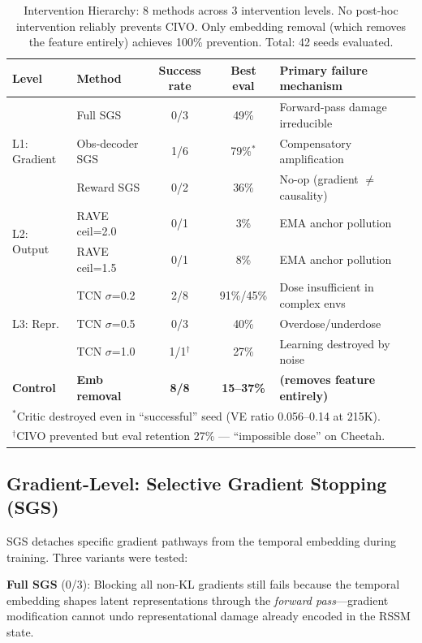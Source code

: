\documentclass[10pt,letterpaper]{article}
\begin{document}
\begin{table}[h]
\centering
\caption{Intervention Hierarchy: 8 methods across 3 intervention levels. No post-hoc intervention reliably prevents CIVO. Only embedding removal (which removes the feature entirely) achieves 100\% prevention. Total: 42 seeds evaluated.}
\label{tab:hierarchy}
\small
\begin{tabular}{llccl}
\toprule
Level & Method & Success rate & Best eval & Primary failure mechanism \\
\midrule
\multirow{3}{*}{L1: Gradient} & Full SGS & 0/3 & 49\% & Forward-pass damage irreducible \\
& Obs-decoder SGS & 1/6 & 79\%$^*$ & Compensatory amplification \\
& Reward SGS & 0/2 & 36\% & No-op (gradient $\neq$ causality) \\
\midrule
\multirow{2}{*}{L2: Output} & RAVE ceil=2.0 & 0/1 & 3\% & EMA anchor pollution \\
& RAVE ceil=1.5 & 0/1 & 8\% & EMA anchor pollution \\
\midrule
\multirow{3}{*}{L3: Repr.} & TCN $\sigma$=0.2 & 2/8 & 91\%/45\% & Dose insufficient in complex envs \\
& TCN $\sigma$=0.5 & 0/3 & 40\% & Overdose/underdose \\
& TCN $\sigma$=1.0 & 1/1$^\dagger$ & 27\% & Learning destroyed by noise \\
\midrule
\textbf{Control} & \textbf{Emb removal} & \textbf{8/8} & \textbf{15--37\%} & \textbf{(removes feature entirely)} \\
\bottomrule
\multicolumn{5}{l}{\footnotesize $^*$Critic destroyed even in ``successful'' seed (VE ratio 0.056--0.14 at 215K).} \\
\multicolumn{5}{l}{\footnotesize $^\dagger$CIVO prevented but eval retention 27\% --- ``impossible dose'' on Cheetah.}
\end{tabular}
\end{table}

\subsection{Gradient-Level: Selective Gradient Stopping (SGS)}

SGS detaches specific gradient pathways from the temporal embedding during training.
Three variants were tested:

\textbf{Full SGS} (0/3): Blocking all non-KL gradients still fails because the temporal embedding shapes latent representations through the \emph{forward pass}---gradient modification cannot undo representational damage already encoded in the RSSM state.
\end{document}
